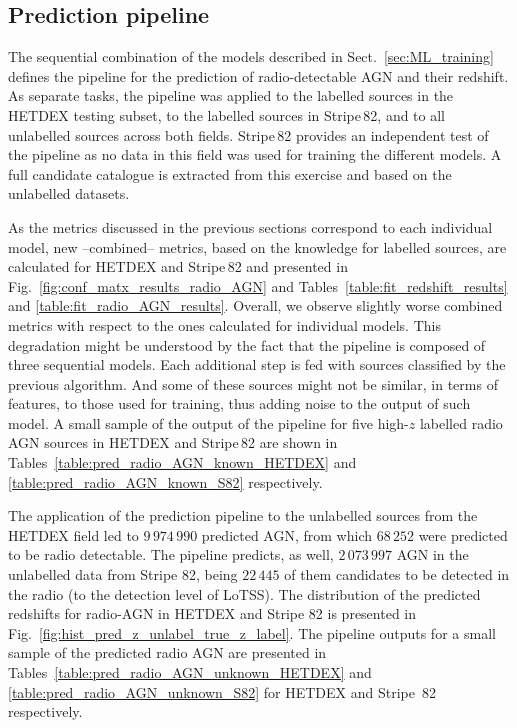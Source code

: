 \documentclass{aa}
\begin{document}

\subsection{Prediction pipeline}\label{sec:results_prediction_pipeline}

The sequential combination of the models described in Sect.~\ref{sec:ML_training} defines the pipeline for the prediction of radio-detectable AGN and their redshift. As separate tasks, the pipeline was applied to the labelled sources in the HETDEX testing subset, to the labelled sources in Stripe\,82, and to all unlabelled sources across both fields. Stripe\,82 provides an independent test of the pipeline as no data in this field was used for training the different models. A full candidate catalogue is extracted from this exercise and based on the unlabelled datasets.

As the metrics discussed in the previous sections correspond to each individual model, new --combined-- metrics, based on the knowledge for labelled sources, are calculated for HETDEX and Stripe\,82 and presented in Fig.~\ref{fig:conf_matx_results_radio_AGN} and Tables~\ref{table:fit_redshift_results} and \ref{table:fit_radio_AGN_results}. Overall, we observe slightly worse combined metrics  with respect to the ones calculated for individual models. This degradation might be understood by the fact that the pipeline is composed of three sequential models. Each additional step is fed with sources classified by the previous algorithm. And some of these sources might not be similar, in terms of features, to those used for training, thus adding noise to the output of such model. A small sample of the output of the pipeline for five high-$z$ labelled radio AGN sources in HETDEX and Stripe\,82 are shown in Tables~\ref{table:pred_radio_AGN_known_HETDEX} and \ref{table:pred_radio_AGN_known_S82} respectively.

The application of the prediction pipeline to the unlabelled sources from the HETDEX field led to $9\,974\,990$ predicted AGN, from which $68\,252$ were predicted to be radio detectable. The pipeline predicts, as well, $2\,073\,997$ AGN in the unlabelled data from Stripe 82, being $22\,445$ of them candidates to be detected in the radio (to the detection level of LoTSS). 
The distribution of the predicted redshifts for radio-AGN in HETDEX and Stripe 82 is presented in  Fig.~\ref{fig:hist_pred_z_unlabel_true_z_label}. The pipeline outputs for a small sample of the predicted radio AGN are presented in Tables~\ref{table:pred_radio_AGN_unknown_HETDEX} and \ref{table:pred_radio_AGN_unknown_S82} for HETDEX and Stripe\, 82 respectively.
\end{document}
